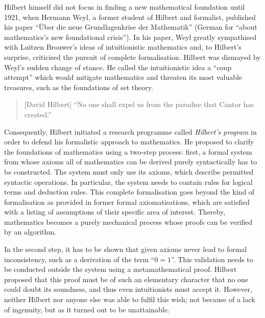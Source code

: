 \documentclass{article}
\begin{document}
Hilbert himself did not focus in finding a new mathematical foundation until 1921, when Hermann Weyl, a former student of Hilbert and formalist, published his paper ``Über die neue Grundlagenkrise der Mathematik'' (German for ``about mathematics's new foundational crisis''). In his paper, Weyl greatly sympathised with Luitzen Brouwer's ideas of intuitionistic mathematics and, to Hilbert's surprise, criticised the pursuit of complete formalisation. Hilbert was dismayed by Weyl's sudden change of stance. He called the intuitionistic idea a ``coup attempt'' which would mitigate mathematics and threaten its most valuable treasures, such as the foundations of set theory.\cite{hilbert_coup}
\begin{quote}[David Hilbert]
``No one shall expel us from the paradise that Cantor has created.''\cite{hilbert_paradise}
\end{quote}
Consequently, Hilbert initiated a research programme called \textit{Hilbert's program} in order to defend his formalistic approach to mathematics. He proposed to clarify the foundations of mathematics using a two-step process: first, a formal system from whose axioms all of mathematics can be derived purely syntactically has to be constructed. The system must only use its axioms, which describe permitted syntactic operations. In particular, the system needs to contain rules for logical terms and deduction rules. This complete formalisation goes beyond the kind of formalisation as provided in former formal axiomatisations, which are satisfied with a listing of assumptions of their specific area of interest. Thereby, mathematics becomes a purely mechanical process whose proofs can be verified by an algorithm.

In the second step, it has to be shown that given axioms never lead to formal inconsistency, such as a derivation of the term ``$0=1$''. This validation needs to be conducted outside the system using a metamathematical proof. Hilbert proposed that this proof must be of such an elementary character that no one could doubt its soundness, and thus even intuitionists must accept it. However, neither Hilbert nor anyone else was able to fulfil this wish; not because of a lack of ingenuity, but as it turned out to be unattainable.
\end{document}
